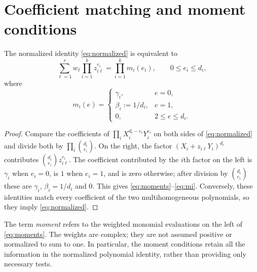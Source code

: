 \section{Coefficient matching and moment conditions}\label{sec:moments}

\begin{lemma}\label{lem:moments}
The normalized identity \eqref{eq:normalized} is equivalent to
\begin{equation}\label{eq:moments}
\sum_{\ell=1}^r w_\ell\prod_{i=1}^k z_{i\ell}^{e_i}
=\prod_{i=1}^k m_i(e_i),
\qquad 0\le e_i\le d_i,
\end{equation}
where
\begin{equation}\label{eq:mi}
m_i(e)=
\begin{cases}
\gamma_i,&e=0,\\
\beta_i:=1/d_i,&e=1,\\
0,&2\le e\le d_i.
\end{cases}
\end{equation}
\end{lemma}
\begin{proof}
Compare the coefficients of $\prod_iX_i^{d_i-e_i}Y_i^{e_i}$ on both
sides of \eqref{eq:normalized} and divide both by
$\prod_i\binom{d_i}{e_i}$. On the right, the factor
$(X_i+z_{i\ell}Y_i)^{d_i}$ contributes $\binom{d_i}{e_i}z_{i\ell}^{e_i}$.
The coefficient contributed by the $i$th factor on the left is
$\gamma_i$ when $e_i=0$, is $1$ when $e_i=1$, and is zero otherwise;
after division by $\binom{d_i}{e_i}$ these are $\gamma_i$,
$\beta_i=1/d_i$ and $0$.
This gives \eqref{eq:moments}--\eqref{eq:mi}.
Conversely, these identities match every coefficient of the two
multihomogeneous polynomials, so they imply \eqref{eq:normalized}.
\end{proof}

The term \emph{moment} refers to the weighted monomial evaluations on
the left of \eqref{eq:moments}. The weights are complex; they are not
assumed positive or normalized to sum to one. In particular, the
moment conditions retain all the information in the normalized
polynomial identity, rather than providing only necessary tests.
